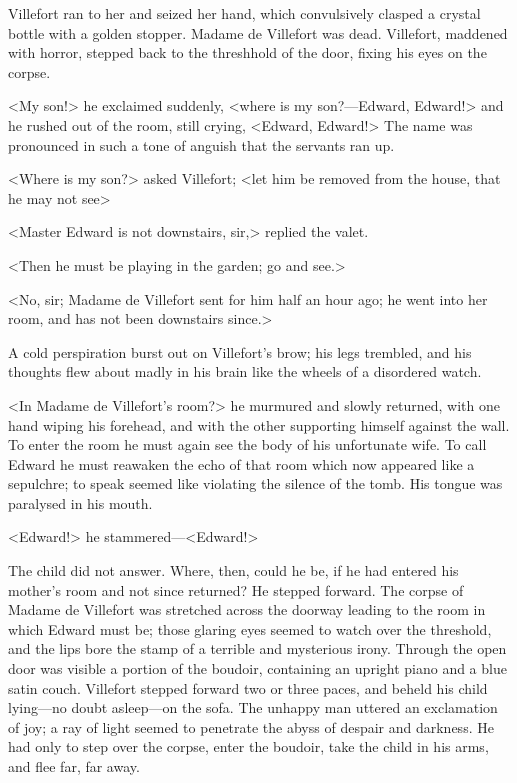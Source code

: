  Villefort ran to her and seized her hand, which convulsively clasped a crystal bottle with a golden stopper. Madame de Villefort was dead. Villefort, maddened with horror, stepped back to the threshhold of the door, fixing his eyes on the corpse. 

 <My son!> he exclaimed suddenly, <where is my son?—Edward, Edward!> and he rushed out of the room, still crying, <Edward, Edward!> The name was pronounced in such a tone of anguish that the servants ran up. 

 <Where is my son?> asked Villefort; <let him be removed from the house, that he may not see\longdash> 

 <Master Edward is not downstairs, sir,> replied the valet. 

 <Then he must be playing in the garden; go and see.>

<No, sir; Madame de Villefort sent for him half an hour ago; he went into her room, and has not been downstairs since.> 

 A cold perspiration burst out on Villefort's brow; his legs trembled, and his thoughts flew about madly in his brain like the wheels of a disordered watch. 

 <In Madame de Villefort's room?> he murmured and slowly returned, with one hand wiping his forehead, and with the other supporting himself against the wall. To enter the room he must again see the body of his unfortunate wife. To call Edward he must reawaken the echo of that room which now appeared like a sepulchre; to speak seemed like violating the silence of the tomb. His tongue was paralysed in his mouth. 

 <Edward!> he stammered—<Edward!> 

 The child did not answer. Where, then, could he be, if he had entered his mother's room and not since returned? He stepped forward. The corpse of Madame de Villefort was stretched across the doorway leading to the room in which Edward must be; those glaring eyes seemed to watch over the threshold, and the lips bore the stamp of a terrible and mysterious irony. Through the open door was visible a portion of the boudoir, containing an upright piano and a blue satin couch. Villefort stepped forward two or three paces, and beheld his child lying—no doubt asleep—on the sofa. The unhappy man uttered an exclamation of joy; a ray of light seemed to penetrate the abyss of despair and darkness. He had only to step over the corpse, enter the boudoir, take the child in his arms, and flee far, far away. 


